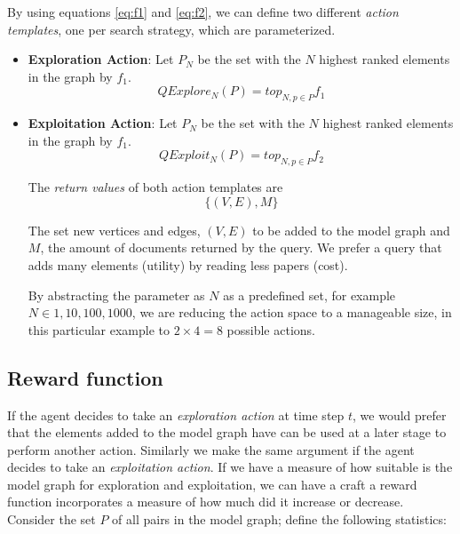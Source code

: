 \documentclass[12pt]{article}
\begin{document}
By using equations \ref{eq:f1} and \ref{eq:f2}, we can define two different \emph{action templates}, one per search strategy, which are parameterized.

\begin{itemize}
  \item \textbf{Exploration Action}: Let $P_N$ be the set with the $N$ highest ranked elements in the graph by $f_1$.\begin{equation}
  QExplore_N(P) = top_{N, p \in P} f_1
\end{equation}

  \item \textbf{Exploitation Action}: Let $P_N$ be the set with the $N$ highest ranked elements in the graph by $f_1$.\begin{equation}
  QExploit_N(P) = top_{N, p \in P} f_2
\end{equation}

The \emph{return values} of both action templates are
\begin{equation}
\label{eq:return}
  \{(V,E), M\}
\end{equation}

 The set new vertices and edges, $(V,E)$ to be added to the model graph and $M$, the amount of documents returned by the query. We prefer a query that adds many elements (utility) by reading less papers (cost).

By abstracting the parameter as $N$ as a predefined set, for example $N \in {1,10,100,1000}$, we are reducing the action space to a manageable size, in this particular example to $2 \times 4 = 8$ possible actions.
\end{itemize}


\subsection{Reward function}

If the agent decides to take an \emph{exploration action} at time step $t$, we would prefer that the elements added to the model graph have can be used at a later stage to perform another action. Similarly we make the same argument if the agent decides to take an \emph{exploitation action}. If we have a measure of how suitable is the model graph for exploration and exploitation, we can have a craft a reward function incorporates a measure of how much did it increase or decrease. Consider the set $P$ of all pairs in the model graph; define the following statistics:
\end{document}
